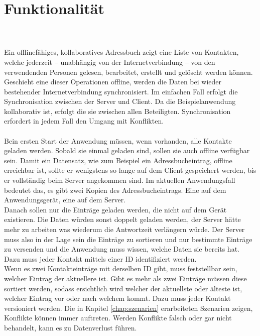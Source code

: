 \section{Funktionalität}
\\\\
Ein offlinefähiges, kollaboratives Adressbuch zeigt eine Liste von Kontakten, welche jederzeit -- unabhängig von der Internetverbindung -- von den verwendenden Personen gelesen, bearbeitet, erstellt und gelöscht werden können.
Geschieht eine dieser Operationen offline, werden die Daten bei wieder bestehender Internetverbindung synchronisiert. Im einfachen Fall erfolgt die Synchronisation zwischen der Server und Client. Da die Beispielanwendung kollaborativ ist, erfolgt die sie zwischen allen Beteiligten. Synchronisation erfordert in jedem Fall den Umgang mit Konflikten.\\\\
%
Bein ersten Start der Anwendung müssen, wenn vorhanden, alle Kontakte geladen werden. Sobald sie einmal geladen sind, sollen sie auch offline verfügbar sein.
Damit ein Datensatz, wie zum Beispiel ein Adressbucheintrag, offline erreichbar ist, sollte er wenigstens so lange auf dem Client gespeichert werden, bis er vollständig beim Server angekommen sind. Im aktuellen Anwendungsfall bedeutet das, es gibt zwei Kopien des Adressbucheintrags. Eine auf dem Anwendungsgerät, eine auf dem Server.\\
Danach sollen nur die Einträge geladen werden, die nicht auf dem Gerät existieren.
Die Daten würden sonst doppelt geladen werden, der Server hätte mehr zu arbeiten was wiederum die Antwortzeit verlängern würde.
Der Server muss also in der Lage sein die Einträge zu sortieren und nur bestimmte Einträge zu versenden und die Anwendung muss wissen, welche Daten sie bereits hat. Dazu muss jeder Kontakt mittels einer ID identifiziert werden.\\
Wenn es zwei Kontakteinträge mit derselben ID gibt, muss feststellbar sein, welcher Eintrag der aktuellere ist. Gibt es mehr als zwei Einträge müssen diese sortiert werden, sodass ersichtlich wird welcher der aktuellste oder älteste ist, welcher Eintrag vor oder nach welchem kommt. Dazu muss jeder Kontakt versioniert werden.
%
%
Die in Kapitel \ref{chap:szenarien} erarbeiteten Szenarien zeigen, Konflikte können immer auftreten. Werden Konflikte falsch oder gar nicht behandelt, kann es zu Datenverlust führen.
